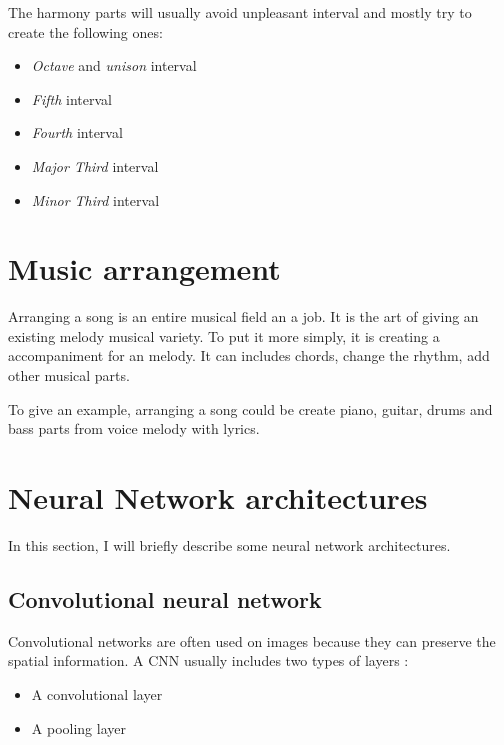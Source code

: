\documentclass[12pt]{report}
\begin{document}
The harmony parts will usually avoid unpleasant interval and mostly try to create the following ones: 
\begin{itemize}
    \item \textit{Octave} and \textit{unison} interval
    \item \textit{Fifth} interval
    \item \textit{Fourth} interval
    \item \textit{Major Third} interval
    \item \textit{Minor Third} interval
\end{itemize}



\section{Music arrangement}
\label{sec:back:music-arrangement}

Arranging a song is an entire musical field an a job.
It is the art of giving an existing melody musical variety.
To put it more simply, it is creating a accompaniment for an melody.
It can includes chords, change the rhythm, add other musical parts.

To give an example, arranging a song could be create piano, guitar, drums and bass parts from voice melody with lyrics.



\section{Neural Network architectures}
\label{sec:back:nn-architectures}

In this section, I will briefly describe some neural network architectures.

\subsection{Convolutional neural network}

Convolutional networks are often used on images because they can preserve the spatial information.
A CNN usually includes two types of layers :
\begin{itemize}
    \item A convolutional layer
    \item A pooling layer
\end{itemize}
\end{document}
